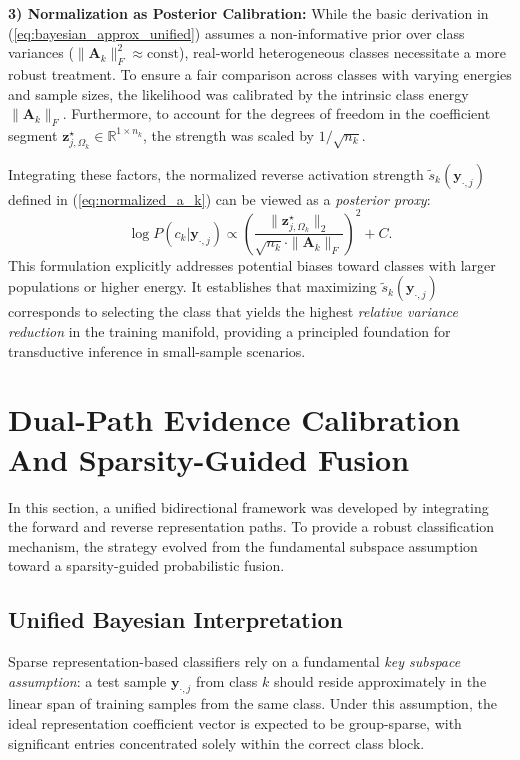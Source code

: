 \documentclass[10pt,comsoc]{IEEEtran}
\begin{document}
\textbf{3) Normalization as Posterior Calibration:}
While the basic derivation in (\ref{eq:bayesian_approx_unified}) assumes a non-informative prior over class variances ($\|\mathbf{A}_k\|_F^2 \approx \text{const}$), real-world heterogeneous classes necessitate a more robust treatment. To ensure a fair comparison across classes with varying energies and sample sizes, the likelihood was calibrated by the intrinsic class energy $\|\mathbf{A}_k\|_F$. Furthermore, to account for the degrees of freedom in the coefficient segment $\mathbf{z}_{j, \Omega_k}^\star \in \mathbb{R}^{1 \times n_k}$, the strength was scaled by $1/\sqrt{n_k}$.

Integrating these factors, the normalized reverse activation strength $\tilde{s}_k(\mathbf{y}_{\cdot,j})$ defined in (\ref{eq:normalized_a_k}) can be viewed as a \textit{posterior proxy}:
\begin{equation}
\log P(c_k | \mathbf{y}_{\cdot,j}) \propto \left( \frac{\|\mathbf{z}_{j, \Omega_k}^\star\|_2}{\sqrt{n_k} \cdot \|\mathbf{A}_k\|_F} \right)^2 + C.
\end{equation}
This formulation explicitly addresses potential biases toward classes with larger populations or higher energy. It establishes that maximizing $\tilde{s}_k(\mathbf{y}_{\cdot,j})$ corresponds to selecting the class that yields the highest \textit{relative variance reduction} in the training manifold, providing a principled foundation for transductive inference in small-sample scenarios.

\section{Dual-Path Evidence Calibration And Sparsity-Guided Fusion}

In this section, a unified bidirectional framework was developed by integrating the forward and reverse representation paths. To provide a robust classification mechanism, the strategy evolved from the fundamental subspace assumption toward a sparsity-guided probabilistic fusion.

\subsection{Unified Bayesian Interpretation}
Sparse representation-based classifiers rely on a fundamental \textit{key subspace assumption}: a test sample $\mathbf{y}_{\cdot,j}$ from class $k$ should reside approximately in the linear span of training samples from the same class. Under this assumption, the ideal representation coefficient vector is expected to be group-sparse, with significant entries concentrated solely within the correct class block. 
\end{document}
